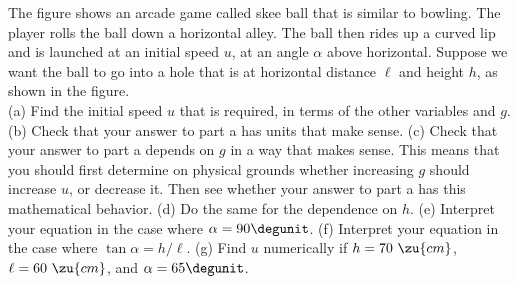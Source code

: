 The figure shows an arcade game called skee ball that is similar to bowling.
The player rolls the ball down a horizontal alley. The ball then rides up
a curved lip and is launched at an initial speed $u$, at an angle $\alpha$
above horizontal. Suppose we want the ball to go into a hole that is at horizontal
distance $\ell$ and height $h$, as shown in the figure.\\
(a) Find the initial speed $u$ that is required, in terms of the other variables and $g$.\answercheck\hwendpart
(b) Check that your answer to part a has units that make sense.\hwendpart
(c) Check that your answer to part a depends on $g$ in a way that makes sense. This means
that you should first determine on physical grounds whether increasing $g$ should increase
$u$, or decrease it. Then see whether your answer to part a has this mathematical behavior.\hwendpart
(d) Do the same for the dependence on $h$.\hwendpart
(e) Interpret your equation in the case where $\alpha=90\degunit$.\hwendpart
(f) Interpret your equation in the case where $\tan\alpha=h/\ell$.\hwendpart
(g) Find $u$ numerically if $h=70\ \zu{cm}$, $\ell=60\ \zu{cm}$, and $\alpha=65\degunit$.\answercheck\hwendpart
